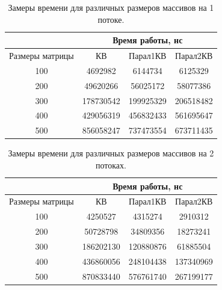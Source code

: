 \documentclass[12pt]{report}
\begin{document}
\newpage
\begin{table}[h]
	\begin{center}
		\caption{\label{time1} Замеры времени для различных размеров массивов на 1 потоке.}
		\begin{tabular}{|c |c |c |c|} 
 			\hline
 			&\multicolumn{3}{|c|}{Время работы, нс}\\
 			\hline
			Размеры матрицы & КВ & Парал1КВ & Парал2КВ \\ [0.5ex] 
 			\hline\hline
 			100 & 4692982 & 6144734 & 6125329 \\
 			\hline
 			200 & 49620266 & 56025172 & 58077386 \\
 			\hline
			300 & 178730542 & 199925329 & 206518482 \\
			\hline
			400 & 429056319 & 456832433 & 561695647 \\
			\hline
			500 & 856058247 & 737473554 & 673711435 \\
			\hline
			\end{tabular}
	\end{center}
\end{table}

\begin{table}[h]
	\begin{center}
		\caption{\label{time2} Замеры времени для различных размеров массивов на 2 потоках.}
		\begin{tabular}{|c |c |c |c|} 
 			\hline
 			&\multicolumn{3}{|c|}{Время работы, нс}\\
 			\hline
			Размеры матрицы & КВ & Парал1КВ & Парал2КВ \\ [0.5ex] 
 			\hline\hline
 			100 & 4250527 & 4315274 & 2910312\\
 			\hline
 			200 & 50728798 & 34809356 & 18273241 \\
 			\hline
			300 & 186202130 & 120880876 & 61885504 \\
			\hline
			400 & 436860056 & 248104438 & 137340969 \\
			\hline
			500 & 870833440 & 576761740 & 267199177 \\
			\hline
			\end{tabular}
	\end{center}
\end{table}
\end{document}
